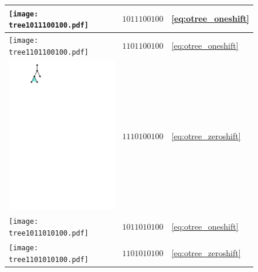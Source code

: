 \begin{figure}[ht]
\begin{minipage}[t]{0.325\linewidth}
\begin{tabular}{| m{} m{5em} m{} |}
\texttt{[image: tree1011100100.pdf]} & $1011100100$ & \eqref{eq:otree_oneshift}  \\ \hline
\texttt{[image: tree1101100100.pdf]} & $1101100100$ & \eqref{eq:otree_oneshift}  \\ \hline
\includegraphics[scale=0.25]{tree1110100100.pdf} & $1110100100$ & \eqref{eq:otree_zeroshift} \\ \hline
\texttt{[image: tree1011010100.pdf]} & $1011010100$ & \eqref{eq:otree_oneshift}  \\ \hline
\texttt{[image: tree1101010100.pdf]} & $1101010100$ & \eqref{eq:otree_zeroshift} \\ \hline

\end{tabular}
\end{minipage}
\end{figure}
